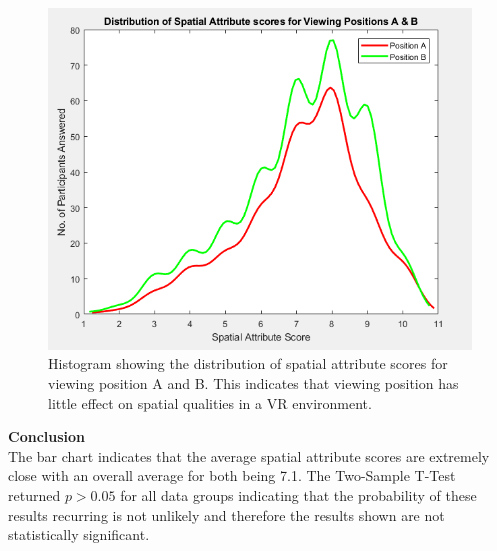 		\begin{figure}[t]
			\includegraphics[width=\linewidth]{images/stats/AvsB_sa_stack_all.PNG}
			\caption{Histogram showing the distribution of spatial attribute scores for viewing position A and B. This indicates that viewing position has little effect on spatial qualities in a VR environment.}
			\label{image:AvsB_dist} 
		\end{figure}

		\textbf{Conclusion}\\

		The bar chart indicates that the average spatial attribute scores are extremely close with an overall average for both being 7.1. The Two-Sample T-Test returned $p > 0.05$ for all data groups indicating that the probability of these results recurring is not unlikely and therefore the results shown are not statistically significant.

